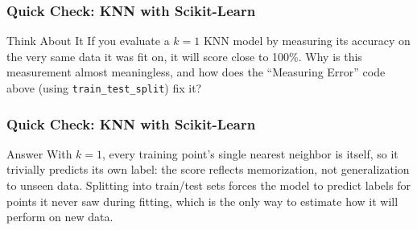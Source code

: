 \begin{frame}[fragile]\frametitle{Quick Check: KNN with Scikit-Learn}
\begin{block}{Think About It}
If you evaluate a $k=1$ KNN model by measuring its accuracy on the very same data it was
fit on, it will score close to 100\%. Why is this measurement almost meaningless, and how
does the ``Measuring Error'' code above (using \texttt{train\_test\_split}) fix it?
\end{block}
\end{frame}

\begin{frame}[fragile]\frametitle{Quick Check: KNN with Scikit-Learn}
\begin{block}{Answer}
With $k=1$, every training point's single nearest neighbor is itself, so it trivially
predicts its own label: the score reflects memorization, not generalization to unseen
data. Splitting into train/test sets forces the model to predict labels for points it never
saw during fitting, which is the only way to estimate how it will perform on new data.
\end{block}
\end{frame}
